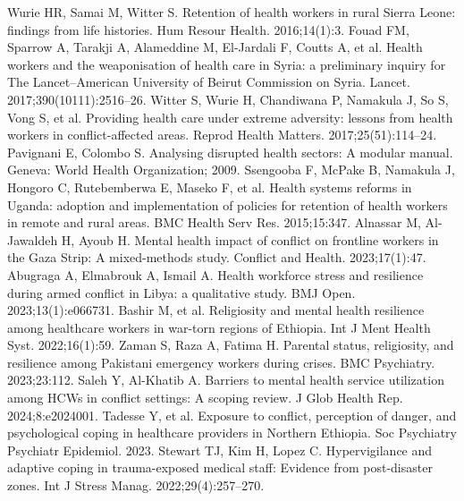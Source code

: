 Wurie HR, Samai M, Witter S. Retention of health workers in rural Sierra Leone: findings from life histories. Hum Resour Health. 2016;14(1):3.
Fouad FM, Sparrow A, Tarakji A, Alameddine M, El-Jardali F, Coutts A, et al. Health workers and the weaponisation of health care in Syria: a preliminary inquiry for The Lancet–American University of Beirut Commission on Syria. Lancet. 2017;390(10111):2516–26.
Witter S, Wurie H, Chandiwana P, Namakula J, So S, Vong S, et al. Providing health care under extreme adversity: lessons from health workers in conflict-affected areas. Reprod Health Matters. 2017;25(51):114–24.
Pavignani E, Colombo S. Analysing disrupted health sectors: A modular manual. Geneva: World Health Organization; 2009.
Ssengooba F, McPake B, Namakula J, Hongoro C, Rutebemberwa E, Maseko F, et al. Health systems reforms in Uganda: adoption and implementation of policies for retention of health workers in remote and rural areas. BMC Health Serv Res. 2015;15:347.
Alnassar M, Al-Jawaldeh H, Ayoub H. Mental health impact of conflict on frontline workers in the Gaza Strip: A mixed-methods study. Conflict and Health. 2023;17(1):47.
Abugraga A, Elmabrouk A, Ismail A. Health workforce stress and resilience during armed conflict in Libya: a qualitative study. BMJ Open. 2023;13(1):e066731.
Bashir M, et al. Religiosity and mental health resilience among healthcare workers in war-torn regions of Ethiopia. Int J Ment Health Syst. 2022;16(1):59.
Zaman S, Raza A, Fatima H. Parental status, religiosity, and resilience among Pakistani emergency workers during crises. BMC Psychiatry. 2023;23:112.
Saleh Y, Al-Khatib A. Barriers to mental health service utilization among HCWs in conflict settings: A scoping review. J Glob Health Rep. 2024;8:e2024001.
Tadesse Y, et al. Exposure to conflict, perception of danger, and psychological coping in healthcare providers in Northern Ethiopia. Soc Psychiatry Psychiatr Epidemiol. 2023.
Stewart TJ, Kim H, Lopez C. Hypervigilance and adaptive coping in trauma-exposed medical staff: Evidence from post-disaster zones. Int J Stress Manag. 2022;29(4):257–270.
